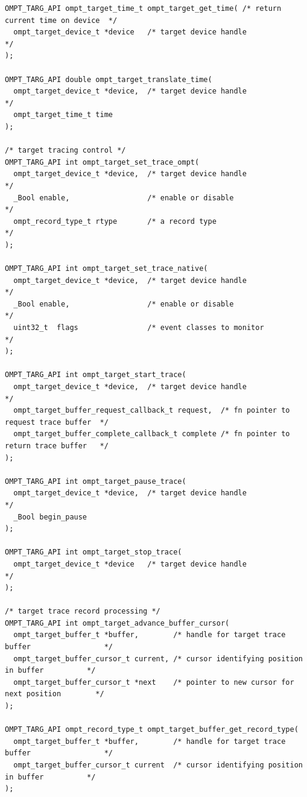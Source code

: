 \documentclass{article}
\begin{document}
\begin{verbatim}
OMPT_TARG_API ompt_target_time_t ompt_target_get_time( /* return current time on device  */
  ompt_target_device_t *device   /* target device handle                                 */
);

OMPT_TARG_API double ompt_target_translate_time(
  ompt_target_device_t *device,  /* target device handle                                 */
  ompt_target_time_t time
);

/* target tracing control */
OMPT_TARG_API int ompt_target_set_trace_ompt(
  ompt_target_device_t *device,  /* target device handle                                 */
  _Bool enable,                  /* enable or disable                                    */
  ompt_record_type_t rtype       /* a record type                                        */
);

OMPT_TARG_API int ompt_target_set_trace_native(
  ompt_target_device_t *device,  /* target device handle                                 */
  _Bool enable,                  /* enable or disable                                    */
  uint32_t  flags                /* event classes to monitor                             */
);

OMPT_TARG_API int ompt_target_start_trace(
  ompt_target_device_t *device,  /* target device handle                                 */
  ompt_target_buffer_request_callback_t request,  /* fn pointer to request trace buffer  */
  ompt_target_buffer_complete_callback_t complete /* fn pointer to return trace buffer   */
);

OMPT_TARG_API int ompt_target_pause_trace(
  ompt_target_device_t *device,  /* target device handle                                 */
  _Bool begin_pause
);

OMPT_TARG_API int ompt_target_stop_trace(
  ompt_target_device_t *device   /* target device handle                                 */
);

/* target trace record processing */
OMPT_TARG_API int ompt_target_advance_buffer_cursor(
  ompt_target_buffer_t *buffer,        /* handle for target trace buffer                 */
  ompt_target_buffer_cursor_t current, /* cursor identifying position in buffer          */
  ompt_target_buffer_cursor_t *next    /* pointer to new cursor for next position        */
);

OMPT_TARG_API ompt_record_type_t ompt_target_buffer_get_record_type(
  ompt_target_buffer_t *buffer,        /* handle for target trace buffer                 */
  ompt_target_buffer_cursor_t current  /* cursor identifying position in buffer          */
);


\end{verbatim}
\end{document}
